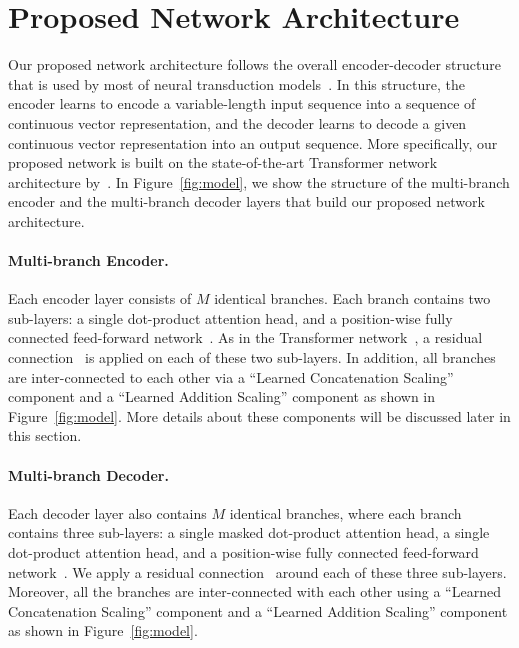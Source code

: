 \documentclass{article} %
\begin{document}
\section{Proposed Network Architecture}
\iffalse
Our proposed network architecture follows the overall encoder-decoder structure that is used by most of neural transduction models~\citet{cho2014learning,bahdanau2014neural,vaswani2017attention}. In this structure, the encoder learns to encode a variable-length input sequence into a sequence of continuous vector representation, and the decoder learns to decode a given continuous vector representation into an output sequence. More specifically, our proposed network is built on the state-of-the-art Transformer network architecture by~\citep{vaswani2017attention}. In Figure~\ref{fig:model}, we show the structure of the multi-branch encoder and the multi-branch decoder layers that build our proposed network architecture. 


\paragraph{Multi-branch Encoder.} Each encoder layer consists of $M$ identical branches. Each branch contains two sub-layers: a single dot-product attention head, and a position-wise fully connected feed-forward network~\citet{vaswani2017attention}. As in the Transformer network~\citet{vaswani2017attention}, a residual connection~\citep{he2016deep} is applied on each of these two sub-layers.
In addition, all branches are inter-connected to each other via a ``Learned Concatenation Scaling'' component and a ``Learned Addition Scaling'' component as shown in Figure~\ref{fig:model}. More details about these components will be discussed later in this section.


\paragraph{Multi-branch Decoder.} Each decoder layer also contains $M$ identical branches, where each branch contains three sub-layers: a single masked dot-product attention head, a single dot-product attention head, and a position-wise fully connected feed-forward network~\citet{vaswani2017attention}. We apply a residual connection~\citep{he2016deep} around each of these three sub-layers. Moreover, all the branches are inter-connected with each other using a ``Learned Concatenation Scaling'' component and a ``Learned Addition Scaling'' component as shown in Figure~\ref{fig:model}. 
\end{document}
